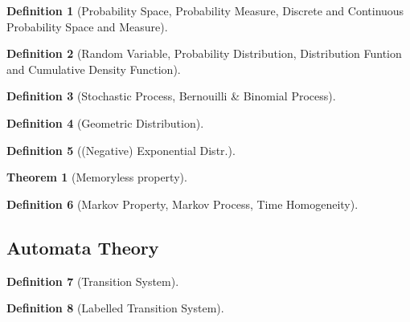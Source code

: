 \documentclass{article} %
\newtheorem{definition}{Definition}[section]
\newtheorem{theorem}{Theorem}[definition]
\begin{document}
        \begin{definition}[Probability Space, Probability Measure, Discrete and Continuous Probability Space and Measure]


        \end{definition}

        \begin{definition}[Random Variable, Probability Distribution, Distribution Funtion and Cumulative Density Function]
        \end{definition}
        
        \begin{definition}[Stochastic Process, Bernouilli \& Binomial Process]
            
        \end{definition}

        \begin{definition}[Geometric Distribution]
            
        \end{definition}
        
        \begin{definition}[(Negative) Exponential Distr.]
         
        \end{definition}

        \begin{theorem}[Memoryless property]
            
        \end{theorem}
            
        \begin{definition}[Markov Property, Markov Process, Time Homogeneity]
         
        \end{definition}
 
 
    \subsection{Automata Theory}
            \begin{definition}[Transition System]
         
        \end{definition}
        
        \begin{definition}[Labelled Transition System]
         
        \end{definition}
        
\end{document}
